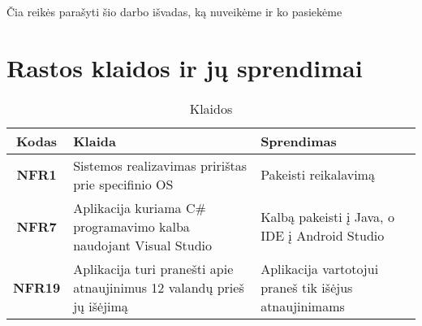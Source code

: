 \documentclass{VUMIFPSbakalaurinis}
\begin{document}
Čia reikės parašyti šio darbo išvadas, ką nuveikėme ir ko pasiekėme

\printbibliography[heading=bibintoc]  %

\appendix
\section{Rastos klaidos ir jų sprendimai}
\begin{table}[H]\footnotesize
	\centering
	\caption{Klaidos}
	{
	\setlength{\arrayrulewidth}{0.25mm}
	{\begin{tabular}{|c|m{5.75cm}|m{5.75cm}|} \hline
	Kodas & Klaida & Sprendimas \\
	\hline
	\textbf{NFR1} & Sistemos realizavimas pririštas prie specifinio OS & Pakeisti reikalavimą \\
	\textbf{NFR7} & Aplikacija kuriama C\# programavimo kalba naudojant Visual Studio & Kalbą pakeisti į Java, o IDE į Android Studio \\
	\textbf{NFR19} & Aplikacija turi pranešti apie atnaujinimus 12 valandų prieš jų išėjimą & Aplikacija vartotojui praneš tik išėjus atnaujinimams \\
	\hline
	\end{tabular}}
	}
	\label{tab:table example}
\end{table}
\end{document}
